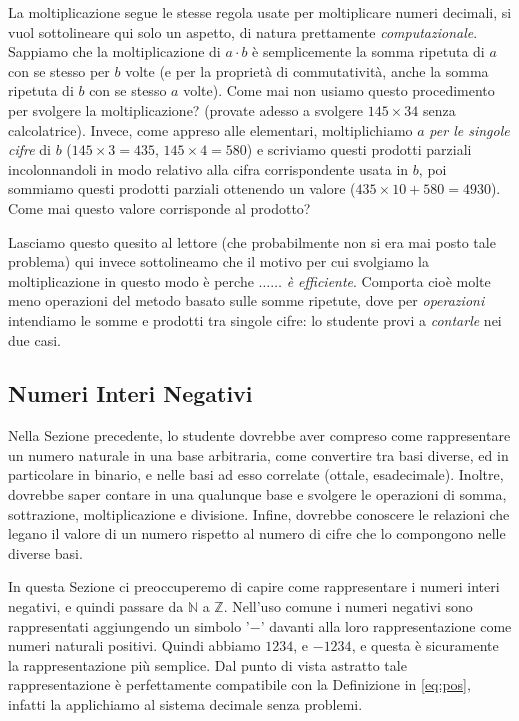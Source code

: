 La moltiplicazione segue le stesse regola usate per moltiplicare numeri
decimali, si vuol sottolineare qui solo un aspetto, di natura prettamente
\emph{computazionale}. Sappiamo che la moltiplicazione di $a \cdot b$ è
semplicemente la somma ripetuta di $a$ con se stesso per $b$ volte (e per la
proprietà di commutatività, anche la somma ripetuta di $b$ con se stesso $a$
volte). Come mai non usiamo questo procedimento per svolgere la
moltiplicazione? (provate adesso a svolgere $145 \times 34$ senza calcolatrice).
Invece, come appreso alle elementari, moltiplichiamo $a$
\emph{per le singole cifre} di $b$ ($145 \times 3 = 435$, $145 \times 4 = 580$)
e scriviamo questi prodotti parziali incolonnandoli in modo relativo alla cifra corrispondente usata in $b$, poi sommiamo questi prodotti parziali ottenendo un valore ($435\times10+580 = 4930$).  Come mai questo valore corrisponde al prodotto? 

Lasciamo questo quesito al lettore (che probabilmente non si era mai posto tale
problema) qui invece sottolineamo che il motivo per cui svolgiamo la
moltiplicazione in questo modo è perche $\ldots\ldots$ \emph{è efficiente}.
Comporta cioè molte meno operazioni del metodo basato sulle somme ripetute,
dove per \emph{operazioni} intendiamo le somme e prodotti tra singole cifre: lo
studente provi a \emph{contarle} nei due casi.


\subsection{Numeri Interi Negativi}

Nella Sezione precedente, lo studente dovrebbe aver compreso come rappresentare
un numero naturale in una base arbitraria, come convertire tra basi diverse, ed
in particolare in binario, e nelle basi ad esso correlate (ottale,
esadecimale). Inoltre, dovrebbe saper contare in una qualunque base e svolgere
le operazioni di somma, sottrazione, moltiplicazione e divisione. Infine,
dovrebbe conoscere le relazioni che legano il valore di un numero rispetto al
numero di cifre che lo compongono nelle diverse basi.

In questa Sezione ci preoccuperemo di capire come rappresentare i numeri interi negativi, e quindi passare da $\mathbb{N}$ a $\mathbb{Z}$. Nell'uso comune i numeri negativi sono rappresentati aggiungendo un simbolo '$-$' davanti alla loro rappresentazione come numeri naturali positivi. Quindi abbiamo $1234$, e $-1234$, e questa è sicuramente la rappresentazione più semplice. Dal punto di vista astratto tale rappresentazione è perfettamente compatibile con la Definizione in \eqref{eq:pos}, infatti la applichiamo al sistema decimale senza problemi.

